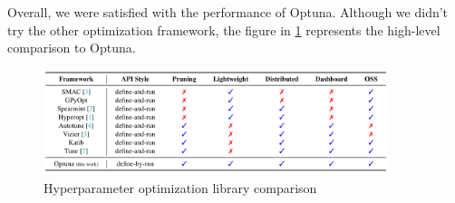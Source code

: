 Overall, we were satisfied with the performance of Optuna. Although we didn’t try the other optimization framework, the figure in \ref{fig:hyperparameteropt} represents the high-level comparison to Optuna.

\begin{figure}[htbp]
    \centering
      \includegraphics[width=0.9\textwidth]{figures/HyperParam}
    \caption{Hyperparameter optimization library comparison \cite{optuna_2019}}
    \label{fig:hyperparameteropt}
\end{figure}